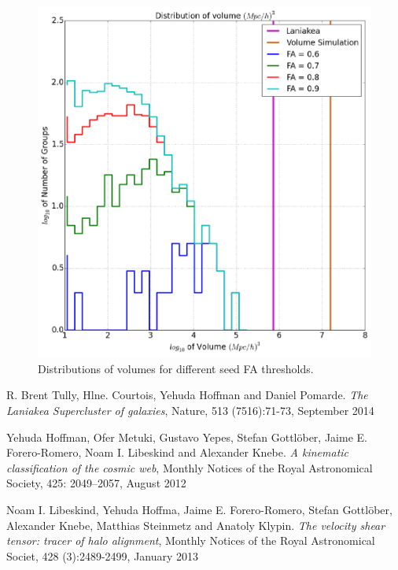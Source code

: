\documentclass[preprint,proceedings]{rmaa}
\begin{document}
\begin{figure}[!t]
  \includegraphics[width=\columnwidth]{SDHernandezSTDivJFig1}
  \caption{Distributions of volumes for different seed FA thresholds.
}
  \label{fig:simple}
\end{figure}


\begin{thebibliography}

 R. Brent Tully, Hlne. Courtois, Yehuda Hoffman and Daniel Pomarde. 
{\em The Laniakea Supercluster of galaxies}, Nature, 513 (7516):71-73, September 2014 
 
 Yehuda Hoffman, Ofer Metuki, Gustavo Yepes, Stefan Gottlöber, Jaime E. Forero-Romero, Noam I. Libeskind and Alexander Knebe. 
{\em A kinematic classification of the cosmic web}, Monthly Notices of the Royal Astronomical Society, 425: 2049–2057, August 2012

 Noam I. Libeskind, Yehuda Hoffma, Jaime E. Forero-Romero, Stefan Gottlöber, Alexander Knebe, Matthias Steinmetz and Anatoly Klypin. 
{\em The velocity shear tensor: tracer of halo alignment}, Monthly Notices of the Royal Astronomical Societ, 428 (3):2489-2499, January 2013
  
\end{thebibliography}
\end{document}
